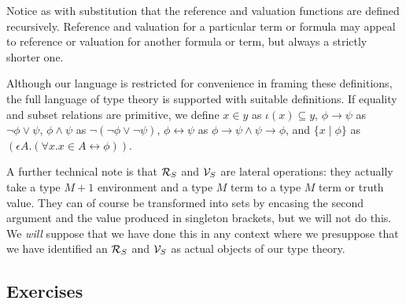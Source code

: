 \documentclass[12pt]{book}
\begin{document}
Notice as with substitution that the reference and valuation functions are
defined recursively.  Reference and valuation for a particular term or formula
may appeal to reference or valuation for another formula or term, but always
a strictly shorter one.

Although our language is restricted for convenience in framing these
definitions, the full language of type theory is supported with
suitable definitions.  If equality and subset relations are primitive,
we define $x \in y$ as $\iota(x) \subseteq y$, $\phi \rightarrow \psi$
as $\neg \phi \vee \psi$, $\phi \wedge \psi$ as $\neg(\neg \phi \vee
\neg \psi)$, $\phi \leftrightarrow \psi$ as $\phi \rightarrow \psi \wedge \psi
\rightarrow \phi$, and $\{x \mid \phi\}$ as $(\epsilon A.(\forall x.x
\in A \leftrightarrow \phi))$.

A further technical note is that ${\cal R}_S$ and ${\cal V}_S$ are lateral operations:  they actually
take a type $M+1$ environment and a type $M$ term to a type $M$ term or truth value.
They can of course be transformed into sets by encasing the second argument and the value produced
in singleton brackets, but we will not do this.    We {\em will\/} suppose that we have done this in any context where we presuppose that we have identified
an ${\cal R}_S$ and ${\cal V}_S$ as actual objects of our type theory.

\newpage

\subsection{Exercises}
\end{document}
